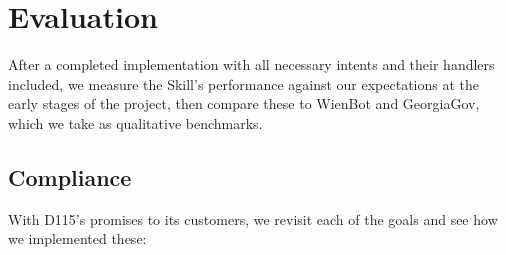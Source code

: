 \chapter{Evaluation}
\label{evaluation}







After a completed implementation with all necessary intents and their handlers included, we measure the Skill's performance against our expectations at the early stages of the project, then compare these to WienBot and GeorgiaGov, which we take as qualitative benchmarks.



\section{Compliance}

With D115's promises to its customers, we revisit each of the goals and see how we implemented these:


